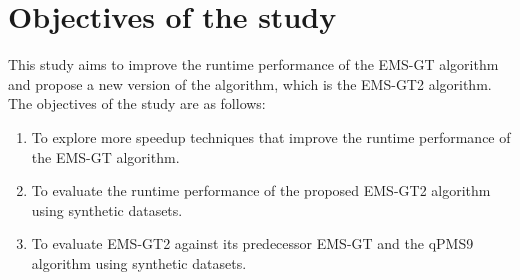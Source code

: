 \section{Objectives of the study}

This study aims to improve the runtime performance of the EMS-GT algorithm and propose a new version of the algorithm, which is the EMS-GT2 algorithm. The objectives of the study are as follows:

\begin{enumerate}
	\item To explore more speedup techniques that improve the runtime performance of the EMS-GT algorithm.

	\item To evaluate the runtime performance of the proposed EMS-GT2 algorithm using synthetic datasets.

	\item To evaluate EMS-GT2 against its predecessor EMS-GT and the qPMS9 algorithm using synthetic datasets.
\end{enumerate}